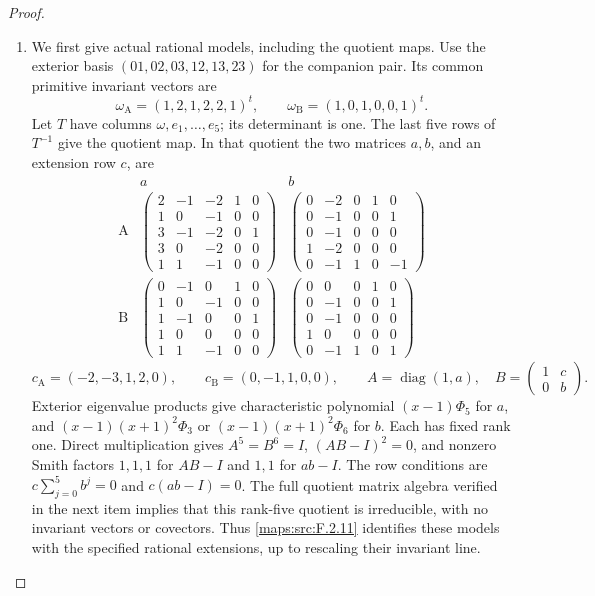 \begin{proof}
\begin{enumerate}[label=\arabic*.]
\item We first give actual rational models, including the quotient
maps.  Use the exterior basis $(01,02,03,12,13,23)$ for the companion
pair.  Its common primitive invariant vectors are
\[
 \omega_{\mathrm A}=(1,2,1,2,2,1)^t,\qquad
 \omega_{\mathrm B}=(1,0,1,0,0,1)^t.
\]
Let $T$ have columns $\omega,e_1,\ldots,e_5$; its determinant is one.
The last five rows of $T^{-1}$ give the quotient map.  In that
quotient the two matrices $a,b$, and an extension row $c$, are
\[
\begin{array}{c|c|c}
 &a&b\\\hline
\mathrm A&
\begin{pmatrix}2&-1&-2&1&0\\1&0&-1&0&0\\3&-1&-2&0&1\\
3&0&-2&0&0\\1&1&-1&0&0\end{pmatrix}&
\begin{pmatrix}0&-2&0&1&0\\0&-1&0&0&1\\0&-1&0&0&0\\
1&-2&0&0&0\\0&-1&1&0&-1\end{pmatrix}\\[3pt]
\mathrm B&
\begin{pmatrix}0&-1&0&1&0\\1&0&-1&0&0\\1&-1&0&0&1\\
1&0&0&0&0\\1&1&-1&0&0\end{pmatrix}&
\begin{pmatrix}0&0&0&1&0\\0&-1&0&0&1\\0&-1&0&0&0\\
1&0&0&0&0\\0&-1&1&0&1\end{pmatrix}
\end{array}
\]
\[
 c_{\mathrm A}=(-2,-3,1,2,0),\qquad
 c_{\mathrm B}=(0,-1,1,0,0),\qquad
 A=\operatorname{diag}(1,a),\quad
 B=\begin{pmatrix}1&c\\0&b\end{pmatrix}.
\]
Exterior eigenvalue products give characteristic polynomial
$(x-1)\Phi _5$ for $a$, and $(x-1)(x+1)^2\Phi _3$ or
$(x-1)(x+1)^2\Phi _6$ for $b$.  Each has fixed rank one.
Direct multiplication gives $A^5=B^6=I$, $(AB-I)^2=0$, and
nonzero Smith factors $1,1,1$ for $AB-I$ and $1,1$ for $ab-I$.
The row conditions are $c\sum_{j=0}^5b^j=0$ and $c(ab-I)=0$.
The full quotient matrix algebra verified in the next item implies
that this rank-five quotient is irreducible, with no invariant
vectors or covectors.  Thus \cref{maps:src:F.2.11} identifies these
models with the specified rational extensions, up to rescaling
their invariant line.


\end{enumerate}
\end{proof}
